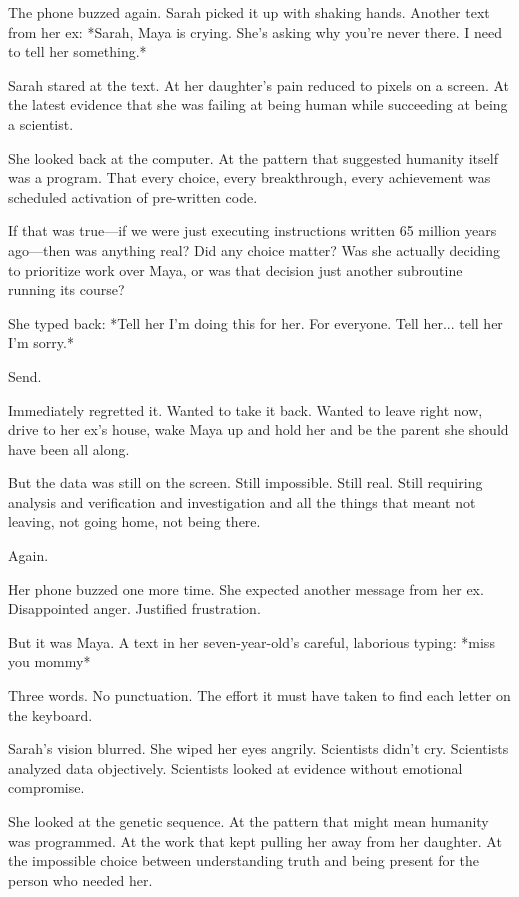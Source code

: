 The phone buzzed again. Sarah picked it up with shaking hands. Another text from her ex: *Sarah, Maya is crying. She's asking why you're never there. I need to tell her something.*

Sarah stared at the text. At her daughter's pain reduced to pixels on a screen. At the latest evidence that she was failing at being human while succeeding at being a scientist.

She looked back at the computer. At the pattern that suggested humanity itself was a program. That every choice, every breakthrough, every achievement was scheduled activation of pre-written code.

If that was true—if we were just executing instructions written 65 million years ago—then was anything real? Did any choice matter? Was she actually deciding to prioritize work over Maya, or was that decision just another subroutine running its course?

She typed back: *Tell her I'm doing this for her. For everyone. Tell her... tell her I'm sorry.*

Send.

Immediately regretted it. Wanted to take it back. Wanted to leave right now, drive to her ex's house, wake Maya up and hold her and be the parent she should have been all along.

But the data was still on the screen. Still impossible. Still real. Still requiring analysis and verification and investigation and all the things that meant not leaving, not going home, not being there.

Again.

Her phone buzzed one more time. She expected another message from her ex. Disappointed anger. Justified frustration.

But it was Maya. A text in her seven-year-old's careful, laborious typing: *miss you mommy*

Three words. No punctuation. The effort it must have taken to find each letter on the keyboard.

Sarah's vision blurred. She wiped her eyes angrily. Scientists didn't cry. Scientists analyzed data objectively. Scientists looked at evidence without emotional compromise.

She looked at the genetic sequence. At the pattern that might mean humanity was programmed. At the work that kept pulling her away from her daughter. At the impossible choice between understanding truth and being present for the person who needed her.

